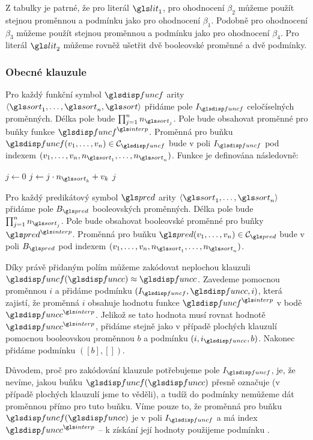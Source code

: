 {Z tabulky je patrné, že pro literál $\lit_1$, pro ohodnocení $\beta_2$
můžeme použít stejnou proměnnou a podmínku jako pro ohodnocení $\beta_1$.
Podobně pro ohodnocení $\beta_3$ můžeme použít stejnou
proměnnou a podmínku jako pro ohodnocení $\beta_4$.
Pro literál $\lit_2$ můžeme rovněž ušetřit dvě booleovské
proměnné a dvě podmínky.

\subsubsection{Obecné klauzule}

\def\Horner{\textproc{Horner}}

Pro každý funkční symbol $\func$ arity
$\langle \sort_1 \comdots \sort_n, \sort \rangle$ přidáme
pole $I_\func$ celočíselných proměnných. Délka
pole bude $\prod_{j=1}^n n_{\sort_j}$. Pole bude obsahovat
proměnné pro buňky funkce $\func^\interp$.
Proměnná pro buňku $\func(v_1 \comdots v_n) \in \cells_\func$
bude v poli $I_\func$ pod indexem
\Horner$(v_1 \comdots v_n, n_{\sort_1} \comdots n_{\sort_n})$.
Funkce \Horner{} je definována následovně:
\medskip
\begin{algorithmic}
  \State $j \gets 0$
    \State $j \gets j \cdot n_{\sort_k} + v_k$
  \EndFor
  \State \Return $j$
\EndFunction
\end{algorithmic}
\medskip

\noindent
Pro každý predikátový symbol $\pred$ arity
$\langle \sort_1 \comdots \sort_n \rangle$
přidáme pole $B_\pred$ booleovských proměnných.
Délka pole bude $\prod_{j=1}^n n_{\sort_j}$. Pole bude obsahovat
booleovské proměnné pro buňky $\pred^\interp$.
Proměnná pro buňku $\pred(v_1 \comdots v_n) \in \cells_\pred$
bude v poli $B_\pred$ pod indexem
\Horner$(v_1 \comdots v_n, n_{\sort_1} \comdots n_{\sort_n})$.

Díky právě přidaným polím můžeme zakódovat neplochou klauzuli
$\func(\funcC) \approx \funcC$. Zavedeme pomocnou
proměnnou $i$ a přidáme podmínku \Element$(I_\func, \funcC, i)$,
která zajistí, že proměnná $i$ obsahuje hodnotu funkce $\func^\interp$
v bodě $\funcC^\interp$. Jelikož se tato hodnota musí rovnat hodnotě
$\funcC^\interp$, přidáme stejně jako v případě plochých klauzulí
pomocnou booleovskou proměnnou $b$ a podmínku \Eq$(i, i_\funcC, b)$.
Nakonec přidáme podmínku \Clause$([b], [])$.

Důvodem, proč pro zakódování klauzule potřebujeme pole $I_\func$,
je, že nevíme, jakou buňku $\func(\funcC)$ přesně označuje
(v případě plochých klauzulí jsme to věděli), a tudíž
do podmínky \Eq{} nemůžeme dát proměnnou přímo pro tuto buňku.
Víme pouze to, že proměnná pro buňku $\func(\funcC)$
je v poli $I_\func$ a má index $\funcC^\interp$ -- k získání
její hodnoty použijeme podmínku \Element.

}
